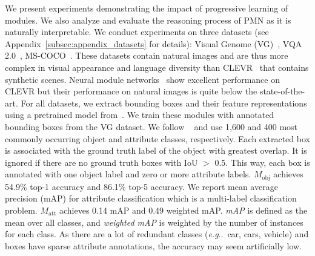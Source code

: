 \documentclass{article}
\makeatletter
\DeclareRobustCommand\onedot{\futurelet\@let@token\@onedot}
\def\@onedot{\ifx\@let@token.\else.\null\fi\xspace}
\def\eg{\emph{e.g}\onedot} \def\Eg{\emph{E.g}\onedot}
\makeatother
\begin{document}

We present experiments demonstrating the impact of progressive learning of modules.
We also analyze and evaluate the reasoning process of PMN as it is naturally interpretable. 
We conduct experiments on three datasets (see Appendix~\ref{subsec:appendix_datasets} for details): Visual Genome (VG)~\citep{krishna16}, VQA 2.0~\citep{goyal17}, MS-COCO~\citep{lin14}.
These datasets contain natural images and are thus more complex in visual appearance and language diversity than CLEVR~\citep{johnson2017clevr} that contains synthetic scenes.
Neural module networks~\citep{andreas16,hu17} show excellent performance on CLEVR but their performance on natural images is quite below the state-of-the-art.
For all datasets, we extract bounding boxes and their feature representations using a pretrained model from~\citet{anderson17}.%
We train these modules with annotated bounding boxes from the VG dataset.
We follow ~\citet{anderson17} and use 1,600 and 400 most commonly occurring object and attribute classes, respectively.
Each extracted box is associated with the ground truth label of the object with greatest overlap.
It is ignored if there are no ground truth boxes with IoU $>$ 0.5.
This way, each box is annotated with one object label and zero or more attribute labels.
$M_\mathrm{obj}$ achieves 54.9\% top-1 accuracy and 86.1\% top-5 accuracy. We report mean average precision (mAP) for attribute classification which is a multi-label classification problem. $M_\mathrm{att}$ achieves 0.14 mAP and 0.49 weighted mAP.
\emph{mAP} is defined as the mean over all classes, and \emph{weighted mAP} is weighted by the number of instances for each class.
As there are a lot of redundant classes (\eg~car, cars, vehicle) and boxes have sparse attribute annotations, the accuracy may seem artificially low.
\end{document}
